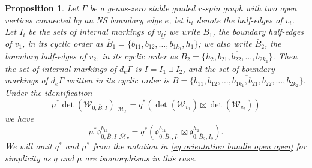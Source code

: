 \documentclass[11pt,a4paper]{article}
\newtheorem{prop}[dummy]{Proposition}
\theoremstyle{definition}
\theoremstyle{remark}
\numberwithin{equation}{section}
\def\Mbar{{\overline{\mathcal M}}}
\begin{document}
\begin{prop}\label{prop: orientation open open}
      Let $\Gamma$ be a genus-zero stable graded $r$-spin graph with two open vertices connected by an NS boundary edge $e$, let $h_i$ denote the half-edges of $v_i$.
      Let $I_i$ be the sets of internal markings of $v_i$; we write $\bar{B}_1$, the boundary half-edges of $v_1$, in its cyclic order as $\bar{B}_1=\overline{\{b_{11},b_{12},\dots,b_{1k_1},h_1\}}$; we also write $\bar{B}_2$, the boundary half-edges of $v_2$, in its cyclic order as $\bar{B}_2=\overline{\{h_2,b_{21},b_{22},\dots,b_{2k_2}\}}$. Then the set of internal markings of $d_e \Gamma$ is $I=I_1\sqcup I_2$, and the set of boundary markings of $d_e \Gamma$ written in its cyclic order is $\bar{B}=\overline{\{b_{11},b_{12},\dots,b_{1k_1},b_{21},b_{22},\dots,b_{2k_2}\}}$. Under the identification 
      \begin{equation}\label{eq NS boundary node det decomp}
          \mu^*\det(\mathcal W_{0,\bar{B},I})\big|_{\Mbar_\Gamma} = q^*\left(\det(\mathcal W_{v_1})\boxtimes \det(\mathcal W_{v_2})\right)
      \end{equation}
       we have
        \begin{equation}\label{eq orientation bundle open open}
        \mu^*{\mathfrak{o}}^{b_{11}}_{0,\bar B,I}\big |_{\Mbar_\Gamma^{}}=
         q^*\left({\mathfrak{o}}^{b_{11}}_{0,\bar B_1,I_1}\boxtimes{\mathfrak{o}}^{h_2}_{0,\bar B_2,I_2}\right).
         \end{equation}
         We will omit $q^*$ and $\mu^*$ from the notation in \eqref{eq orientation bundle open open} for simplicity as $q$ and $\mu$ are isomorphisms in this case.
\end{prop}
\end{document}
